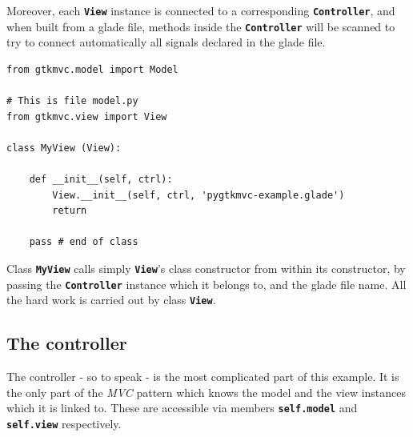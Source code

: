 \documentclass{article}
\newcommand{\kw}[1]{\emph{#1}\xspace}
\newcommand{\mvc}{\kw{MVC} pattern\xspace}
\newcommand{\codename}[1]{\texttt{\bfseries \textcolor {codecolor}{#1}}\xspace}
\newcommand{\codesize}{\small } %
\begin{document}
Moreover, each \codename{View} instance is connected to a
corresponding \codename{Controller}, and when built from a glade file,
methods inside the \codename{Controller} will be scanned to try to
connect automatically all signals declared in the glade file.

{ \codesize 
\begin{verbatim}   
from gtkmvc.model import Model
  
# This is file model.py
from gtkmvc.view import View

class MyView (View):

    def __init__(self, ctrl):
        View.__init__(self, ctrl, 'pygtkmvc-example.glade')
        return

    pass # end of class
\end{verbatim}
}

Class \codename{MyView} calls simply \codename{View}'s class
constructor from within its constructor, by passing the
\codename{Controller} instance which it belongs to, and the glade file
name. All the hard work is carried out by class \codename{View}.


\subsection{The controller}
The controller - so to speak - is the most complicated part of this
example. It is the only part of the \mvc which knows the model and the
view instances which it is linked to. These are accessible via members
\codename{self.model} and \codename{self.view} respectively.
  
\end{document}
